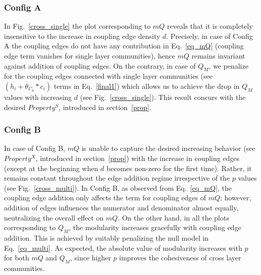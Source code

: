 \subsubsection{Config A}
In Fig.~\ref{cross_single} the plot corresponding to $mQ$ reveals that it is completely insensitive 
to the increase in
coupling edge density $d$. Precisely, in case of Config A the coupling edges
do not have any contribution in Eq.~\ref{eq_mQ} (coupling edge term vanishes for single layer communities),
hence $mQ$ remains invariant against addition of
coupling edges. On the contrary, in case of $Q_M$, we penalize for the coupling edges connected with single layer
communities (see $(h_i+\theta_{C_k}*c_i)$ terms in Eq.~\ref{final1}) which allows us to achieve the drop in $Q_M$ values with 
increasing $d$ (see
Fig.~\ref{cross_single}). This result concurs with the desired $Property^S$, introduced in section~\ref{prop}. 


\subsubsection{Config B}
In case of Config B, $mQ$ is unable to capture the desired increasing behavior (see $Property^X$, introduced in section~\ref{prop}) with
the increase in coupling edges (except at
the beginning when $d$ becomes non-zero for the first time). Rather, it remains constant throughout the edge addition
regime irrespective of the $p$ values (see Fig.~\ref{cross_multi}).
In Config B, as observed from Eq.~\ref{eq_mQ}, the coupling edge addition only affects the 
term for coupling edges
of $mQ$;
however, addition of edges influences the numerator and denominator almost equally, neutralizing the overall effect on $mQ$.
On the other hand, in all the plots corresponding to $Q_M$, the modularity increases gracefully with coupling
edge addition. This is achieved by suitably penalizing the null model in Eq.~\ref{eq_multi}.
As expected, the absolute value of modularity increases with $p$ for both $mQ$ and $Q_M$, since higher $p$ improves the cohesiveness
of cross layer communities.

